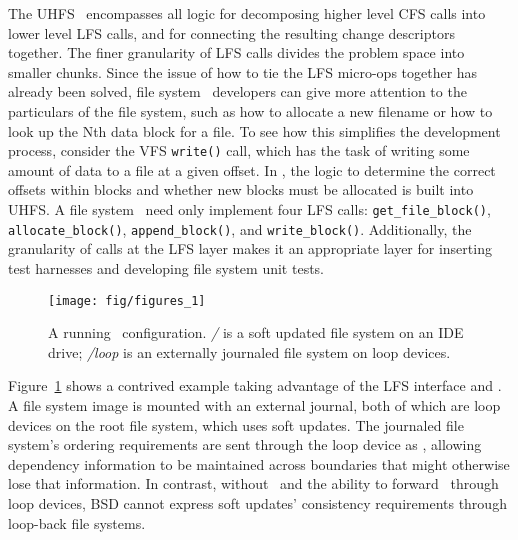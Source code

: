 The UHFS \module\ encompasses all logic for decomposing higher level CFS calls
into lower level LFS calls, and for connecting the resulting change descriptors
together. The finer granularity of LFS calls divides the problem space into
smaller chunks. Since the issue of how to tie the LFS micro-ops together has
already been solved, file system \module\ developers can give more attention to
the particulars of the file system, such as how to allocate a new filename or
how to look up the Nth data block for a file. To see how this simplifies the
development process, consider the VFS \texttt{write()} call, which has the task
of writing some amount of data to a file at a given offset. In \Kudos, the logic
to determine the correct offsets within blocks and whether new blocks must be
allocated is built into UHFS. A file system \module\ need only implement four
LFS calls: \texttt{get\_file\_block()}, \texttt{allocate\_block()},
\texttt{append\_block()}, and \texttt{write\_block()}. Additionally, the
granularity of calls at the LFS layer makes it an appropriate layer for
inserting test harnesses and developing file system unit tests.

\begin{figure}[tb]
  \centering
  \texttt{[image: fig/figures\_1]}
  \caption{A running \Kudos\ configuration. {\it/} is a soft updated
    file system on an IDE drive; {\it/loop} is an externally journaled
    file system on loop devices.}
  \label{fig:kfs-graph}
\end{figure}

Figure~\ref{fig:kfs-graph} shows a contrived example taking advantage of the LFS
interface and \chdescs. A file system image is mounted with an external journal,
both of which are loop devices on the root file system, which uses soft updates.
The journaled file system's ordering requirements are sent through the loop
device as \chdescs, allowing dependency information to be maintained across
boundaries that might otherwise lose that information. In contrast, without
\chdescs\ and the ability to forward \chdescs\ through loop devices, BSD cannot
express soft updates' consistency requirements through loop-back file systems.
